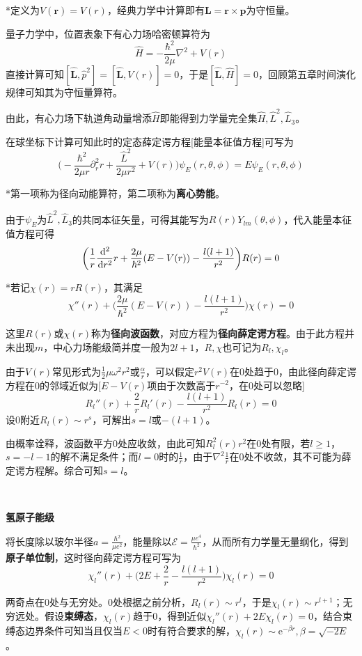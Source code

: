 \documentclass[a4paper,UTF8,fontset=windows]{ctexart}
\newcommand*{\dr}{\hspace{0.07em}\mathrm{d}}
\newcommand*{\er}{\mathrm{e}}
\newcommand*{\br}{\mathbf{r}}
\newcommand*{\bp}{\mathbf{p}}
\newcommand*{\bl}{\mathbf{L}}
\begin{document}
*定义为$V(\br)=V(r)$，经典力学中计算即有$\bl=\br\times\bp$为守恒量。

量子力学中，位置表象下有心力场哈密顿算符为
$$\hat{H}=-\frac{\hbar^2}{2\mu}\nabla^2+V(r)$$
直接计算可知$[\hat{\bl},\hat{p}^2]=[\hat{\bl},V(r)]=0$，于是$[\hat{\bl},\hat{H}]=0$，回顾第五章时间演化规律可知其为守恒量算符。

由此，有心力场下轨道角动量增添$\hat{H}$即能得到力学量完全集$\hat{H},\hat{L}^2,\hat{L}_3$。

在球坐标下计算可知此时的定态薛定谔方程[能量本征值方程]可写为
$$\bigg(-\frac{\hbar^2}{2\mu r}\partial_r^2r+\frac{\hat{L}^2}{2\mu r^2}+V(r)\bigg)\psi_E(r,\theta,\phi)=E\psi_E(r,\theta,\phi)$$

*第一项称为径向动能算符，第二项称为\textbf{离心势能}。

由于$\psi_E$为$\hat{L}^2,\hat{L}_3$的共同本征矢量，可得其能写为$R(r)Y_{lm}(\theta,\phi)$，代入能量本征值方程可得
$$\bigg(\frac{1}{r}\frac{\dr^2}{\dr r^2}r+\frac{2\mu}{\hbar^2}(E-V(r))-\frac{l(l+1)}{r^2}\bigg)R(r)=0$$

*若记$\chi(r)=rR(r)$，其满足
$$\chi''(r)+\bigg(\frac{2\mu}{\hbar^2}(E-V(r))-\frac{l(l+1)}{r^2}\bigg)\chi(r)=0$$

这里$R(r)$或$\chi(r)$称为\textbf{径向波函数}，对应方程为\textbf{径向薛定谔方程}。由于此方程并未出现$m$，中心力场能级简并度一般为$2l+1$，$R,\chi$也可记为$R_l,\chi_l$。

由于$V(r)$常见形式为$\frac{1}{2}\mu\omega^2r^2$或$\frac{\alpha}{r}$，可以假定$r^2V(r)$在0处趋于0，由此径向薛定谔方程在0的邻域近似为[$E-V(r)$项由于次数高于$r^{-2}$，在0处可以忽略]
$$R_l''(r)+\frac{2}{r}R_l'(r)-\frac{l(l+1)}{r^2}R_l(r)=0$$
设0附近$R_l(r)\sim r^s$，可解出$s=l$或$-(l+1)$。

由概率诠释，波函数平方0处应收敛，由此可知$R_l^2(r)r^2$在0处有限，若$l\ge1$，$s=-l-1$的解不满足条件；而$l=0$时的$\frac{1}{r}$，由于$\nabla^2\frac{1}{r}$在0处不收敛，其不可能为薛定谔方程解。综合可知$s=l$。

\

\textbf{氢原子能级}

将长度除以玻尔半径$a=\frac{\hbar^2}{\mu e^2}$，能量除以$\mathcal{E}=\frac{\mu e^4}{\hbar^2}$，从而所有力学量无量纲化，得到\textbf{原子单位制}，这时径向薛定谔方程可写为
$$\chi_l''(r)+\bigg(2E+\frac{2}{r}-\frac{l(l+1)}{r^2}\bigg)\chi_l(r)=0$$

两奇点在0处与无穷处。0处根据之前分析，$R_l(r)\sim r^l$，于是$\chi_l(r)\sim r^{l+1}$；无穷远处。假设\textbf{束缚态}，$\chi_l(r)$趋于0，得到近似$\chi_l''(r)+2E\chi_l(r)=0$，结合束缚态边界条件可知当且仅当$E<0$时有符合要求的解，$\chi_l(r)\sim\er^{-\beta r},\beta=\sqrt{-2E}$。
\end{document}
